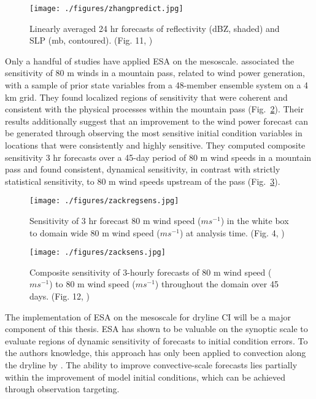 \documentclass{ttuthes2007}
\newcommand{\tab}{\hspace*{2em}}  %
\begin{document}
\begin{figure}[!htb]
  \centering
  \noindent\texttt{[image: ./figures/zhangpredict.jpg]}\\
  \caption{Linearly averaged 24 hr forecasts of reflectivity (dBZ, shaded) and SLP (mb, contoured). (Fig. 11, \citealt{MelhauserandZhang2012})}
\label{zhangpredict}
\end{figure}

\tab Only a handful of studies have applied ESA on the mesoscale. \cite{Zacketal2010a} associated the sensitivity of 80 m winds in a mountain pass, related to wind power generation, with a sample of prior state variables from a 48-member ensemble system on a 4 km grid. They found localized regions of sensitivity that were coherent and consistent with the physical processes within the mountain pass (Fig.~\ref{zackregsens}). Their results additionally suggest that an improvement to the wind power forecast can be generated through observing the most sensitive initial condition variables in locations that were consistently and highly sensitive. They computed composite sensitivity 3 hr forecasts over a 45-day period of 80 m wind speeds in a mountain pass and found consistent, dynamical sensitivity, in contrast with strictly statistical sensitivity, to 80 m wind speeds upstream of the pass (Fig.~\ref{zackclimosens}). 

\begin{figure}[!htb]
  \centering
  \noindent\texttt{[image: ./figures/zackregsens.jpg]}\\
  \caption{Sensitivity of 3 hr forecast 80 m wind speed ($m s^{-1}$) in the white box to domain wide 80 m wind speed ($m s^{-1}$) at analysis time. (Fig. 4, \citealt{Zacketal2010a})}
\label{zackregsens}
\end{figure}

\begin{figure}[!htb]
  \centering
  \noindent\texttt{[image: ./figures/zacksens.jpg]}\\
  \caption{Composite sensitivity of 3-hourly forecasts of 80 m wind speed ($m s^{-1}$) to 80 m wind speed ($m s^{-1}$) throughout the domain over 45 days. (Fig. 12, \citealt{Zacketal2010a})}
\label{zackclimosens}
\end{figure}

\tab The implementation of ESA on the mesoscale for dryline CI will be a major component of this thesis. ESA has shown to be valuable on the synoptic scale to evaluate regions of dynamic sensitivity of forecasts to initial condition errors. To the authors knowledge, this approach has only been applied to convection along the dryline by \cite{BednarczykandAncell2014}. The ability to improve convective-scale forecasts lies partially within the improvement of model initial conditions, which can be achieved through observation targeting.  
\end{document}
